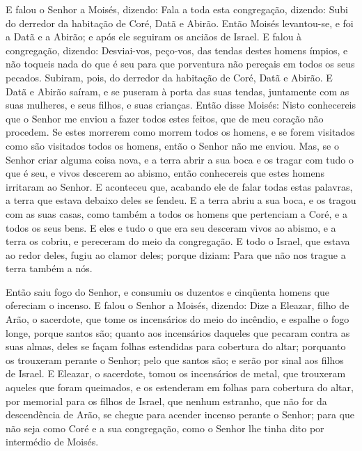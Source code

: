E falou o Senhor a Moisés, dizendo: Fala a toda esta
congregação, dizendo: Subi do derredor da habitação de Coré, Datã e
Abirão. Então Moisés levantou-se, e foi a Datã e a Abirão; e
após ele seguiram os anciãos de Israel. E falou à
congregação, dizendo: Desviai-vos, peço-vos, das tendas destes
homens ímpios, e não toqueis nada do que é seu para que porventura
não pereçais em todos os seus pecados. Subiram, pois, do
derredor da habitação de Coré, Datã e Abirão. E Datã e Abirão
saíram, e se puseram à porta das suas tendas, juntamente com as suas
mulheres, e seus filhos, e suas crianças. Então disse Moisés:
Nisto conhecereis que o Senhor me enviou a fazer todos estes feitos,
que de meu coração não procedem. Se estes morrerem como
morrem todos os homens, e se forem visitados como são visitados
todos os homens, então o Senhor não me enviou. Mas, se o
Senhor criar alguma coisa nova, e a terra abrir a sua boca e os
tragar com tudo o que é seu, e vivos descerem ao abismo, então
conhecereis que estes homens irritaram ao Senhor. E aconteceu
que, acabando ele de falar todas estas palavras, a terra que estava
debaixo deles se fendeu. E a terra abriu a sua boca, e os
tragou com as suas casas, como também a todos os homens que
pertenciam a Coré, e a todos os seus bens. E eles e tudo o
que era seu desceram vivos ao abismo, e a terra os cobriu, e
pereceram do meio da congregação. E todo o Israel, que estava
ao redor deles, fugiu ao clamor deles; porque diziam: Para que não
nos trague a terra também a nós.

Então saiu fogo do Senhor, e consumiu os duzentos e cinqüenta
homens que ofereciam o incenso. E falou o Senhor a Moisés,
dizendo: Dize a Eleazar, filho de Arão, o sacerdote, que tome
os incensários do meio do incêndio, e espalhe o fogo longe, porque
santos são; quanto aos incensários daqueles que pecaram
contra as suas almas, deles se façam folhas estendidas para
cobertura do altar; porquanto os trouxeram perante o Senhor; pelo
que santos são; e serão por sinal aos filhos de Israel. E
Eleazar, o sacerdote, tomou os incensários de metal, que trouxeram
aqueles que foram queimados, e os estenderam em folhas para
cobertura do altar, por memorial para os filhos de Israel,
que nenhum estranho, que não for da descendência de Arão, se chegue
para acender incenso perante o Senhor; para que não seja como Coré e
a sua congregação, como o Senhor lhe tinha dito por intermédio de
Moisés.


